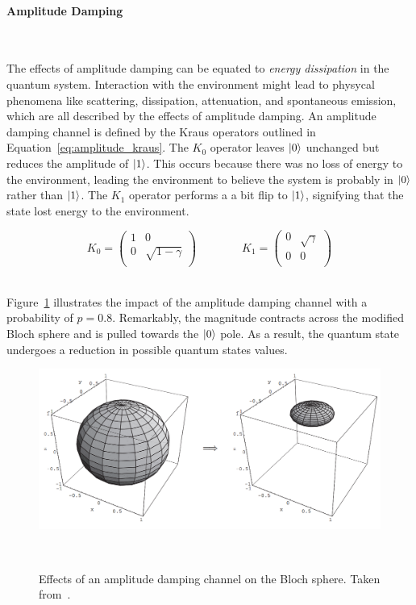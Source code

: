 \paragraph{Amplitude Damping} \

The effects of amplitude damping can be equated to
\textit{energy dissipation} in the quantum system. Interaction with
the environment might lead to physycal phenomena like scattering,
dissipation, attenuation, and spontaneous emission, which are all
described by the effects of amplitude damping. An amplitude
damping channel is defined by the Kraus operators outlined in
Equation~\ref{eq:amplitude_kraus}. The \(K_0\) operator leaves
\(\ket{0}\) unchanged but reduces the amplitude of \(\ket{1}\).
This occurs because there was no loss of energy to the environment,
leading the environment to believe the system is probably in \(\ket{0}\)
rather than \(\ket{1}\). The \(K_1\) operator performs a a bit
flip to \(\ket{1}\), signifying that the state lost energy to the
environment. \

\begin{equation}\label{eq:amplitude_kraus}
  K_0 = \begin{pmatrix}
          1 & 0 \\
          0 & \sqrt{1-\gamma} \\
        \end{pmatrix} \qquad \qquad
  K_1 = \begin{pmatrix}
          0 & \sqrt{\gamma} \\
          0 & 0 \\
        \end{pmatrix}
\end{equation} \

Figure~\ref{fig:amplitude_damping} illustrates the impact of the
amplitude damping channel with a probability of \(p=0.8\). Remarkably,
the magnitude contracts across the modified Bloch sphere and is pulled
towards the \(\ket{0}\) pole. As a result, the quantum state undergoes
a reduction in possible quantum states values. \

\begin{figure}[h!]
  \includegraphics[scale=0.39]{figures/amplitude_damping.png}
  \centering
  \caption{Effects of an amplitude damping channel on the Bloch sphere. Taken from~\cite{nielsen_quantum_2010}.}
~\label{fig:amplitude_damping}
\end{figure} \

